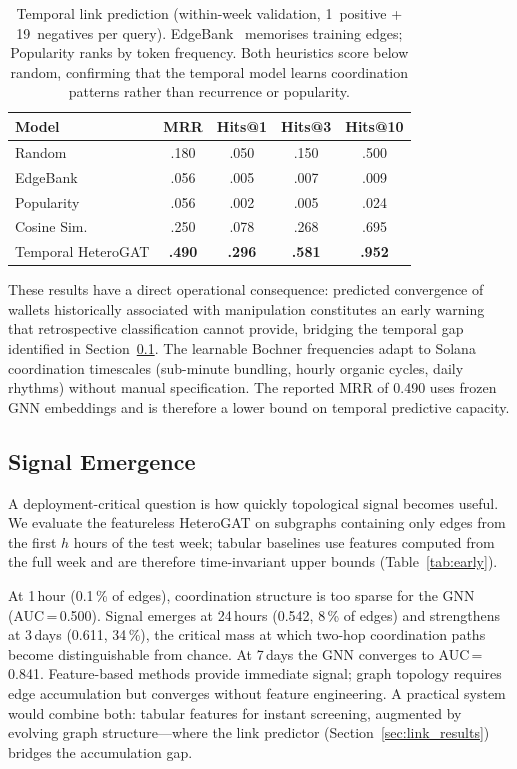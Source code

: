 \documentclass[10pt,journal]{IEEEtran}
\begin{document}
\begin{table}[t]
\caption{Temporal link prediction (within-week validation, 1~positive
+ 19~negatives per query). EdgeBank~\cite{poursafaei2022edgebank}
memorises training edges; Popularity ranks by token frequency.
Both heuristics score below random, confirming that the temporal
model learns coordination patterns rather than recurrence or
popularity.}
\label{tab:link}
\centering\small
\begin{tabular}{lcccc}
\toprule
Model & MRR & Hits@1 & Hits@3 & Hits@10 \\
\midrule
Random & .180 & .050 & .150 & .500 \\
EdgeBank & .056 & .005 & .007 & .009 \\
Popularity & .056 & .002 & .005 & .024 \\
Cosine Sim. & .250 & .078 & .268 & .695 \\
Temporal HeteroGAT & \textbf{.490} & \textbf{.296} & \textbf{.581} & \textbf{.952} \\
\bottomrule
\end{tabular}
\end{table}

These results have a direct operational consequence: predicted
convergence of wallets historically associated with manipulation
constitutes an early warning that retrospective classification cannot
provide, bridging the temporal gap identified in
Section~\ref{sec:early}. The learnable Bochner frequencies adapt to
Solana coordination timescales (sub-minute bundling, hourly organic
cycles, daily rhythms) without manual specification. The reported MRR
of 0.490 uses frozen GNN embeddings and is therefore a lower bound on
temporal predictive capacity.

\subsection{Signal Emergence}
\label{sec:early}

A deployment-critical question is how quickly topological signal
becomes useful. We evaluate the featureless HeteroGAT on subgraphs
containing only edges from the first $h$ hours of the test week;
tabular baselines use features computed from the full week and are
therefore time-invariant upper bounds (Table~\ref{tab:early}).

At 1\,hour (0.1\,\% of edges), coordination structure is too sparse
for the GNN (AUC\,=\,0.500). Signal emerges at 24\,hours (0.542,
8\,\% of edges) and strengthens at 3\,days (0.611, 34\,\%), the
critical mass at which two-hop coordination paths become
distinguishable from chance. At 7\,days the GNN converges to
AUC\,=\,0.841. Feature-based methods provide immediate signal;
graph topology requires edge accumulation but converges without
feature engineering. A practical system would combine both: tabular
features for instant screening, augmented by evolving graph
structure---where the link predictor
(Section~\ref{sec:link_results}) bridges the accumulation gap.
\end{document}
